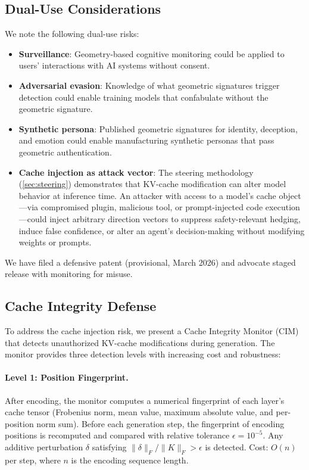 \subsection{Dual-Use Considerations}

We note the following dual-use risks:

\begin{itemize}[nosep]
  \item \textbf{Surveillance}: Geometry-based cognitive monitoring could
    be applied to users' interactions with AI systems without consent.
  \item \textbf{Adversarial evasion}: Knowledge of what geometric
    signatures trigger detection could enable training models that
    confabulate without the geometric signature.
  \item \textbf{Synthetic persona}: Published geometric signatures for
    identity, deception, and emotion could enable manufacturing
    synthetic personas that pass geometric authentication.
  \item \textbf{Cache injection as attack vector}: The steering
    methodology (\cref{sec:steering}) demonstrates that KV-cache
    modification can alter model behavior at inference time. An attacker
    with access to a model's cache object---via compromised plugin,
    malicious tool, or prompt-injected code execution---could inject
    arbitrary direction vectors to suppress safety-relevant hedging,
    induce false confidence, or alter an agent's decision-making without
    modifying weights or prompts.
\end{itemize}

We have filed a defensive patent (provisional, March 2026) and advocate
staged release with monitoring for misuse.

\subsection{Cache Integrity Defense}\label{sec:cache_defense}

To address the cache injection risk, we present a Cache Integrity
Monitor (CIM) that detects unauthorized KV-cache modifications during
generation. The monitor provides three detection levels with increasing
cost and robustness:

\paragraph{Level 1: Position Fingerprint.}
After encoding, the monitor computes a numerical fingerprint of each
layer's cache tensor (Frobenius norm, mean value, maximum absolute
value, and per-position norm sum). Before each generation step, the
fingerprint of encoding positions is recomputed and compared with
relative tolerance $\epsilon = 10^{-5}$. Any additive perturbation
$\delta$ satisfying $\|\delta\|_F / \|K\|_F > \epsilon$ is detected.
Cost: $O(n)$ per step, where $n$ is the encoding sequence length.

